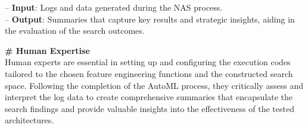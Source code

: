 \documentclass[11pt,UTF8,fontset=fandol]{ctexart}
\begin{document}
\begin{table}[H]
\begin{promptbox}
\hspace*{1em}-- \textbf{Input}: Logs and data generated during the NAS process.\\
\hspace*{1em}-- \textbf{Output}: Summaries that capture key results and strategic insights, aiding in the evaluation of the search outcomes.\par\medskip
\textbf{\# Human Expertise}\\
Human experts are essential in setting up and configuring the execution codes tailored to the chosen feature engineering functions and the constructed search space. Following the completion of the AutoML process, they critically assess and interpret the log data to create comprehensive summaries that encapsulate the search findings and provide valuable insights into the effectiveness of the tested architectures.
\end{promptbox}
\end{table}
\end{document}
